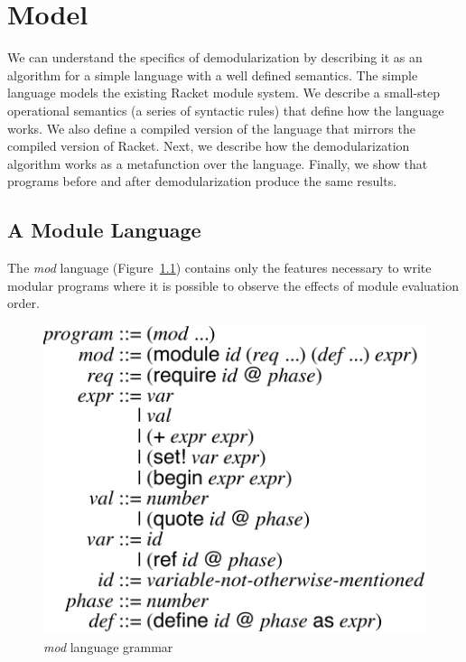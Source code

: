 \chapter{Model}
\label{chap:model}

We can understand the specifics of demodularization by describing it as an algorithm for a simple language with a well defined semantics.
The simple language models the existing Racket module system.
We describe a small-step operational semantics (a series of syntactic rules) that define how the language works.
We also define a compiled version of the language that mirrors the compiled version of Racket.
Next, we describe how the demodularization algorithm works as a metafunction over the language.
Finally, we show that programs before and after demodularization produce the same results.

\section{A Module Language}
The \emph{mod} language (Figure~\ref{fig:source-lang}) contains only the features necessary to write modular programs where it is possible to observe the effects of module evaluation order.

\begin{figure}
\centering
\includegraphics{figures/source}
\caption{\emph{mod} language grammar}
\label{fig:source-lang}
\end{figure}

